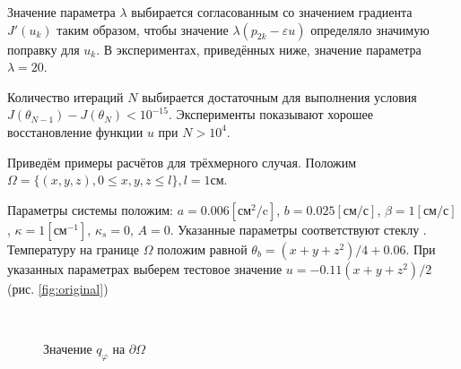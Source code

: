 \documentclass[10pt]{article}
\begin{document}
    Значение параметра $\lambda$ выбирается согласованным со значением градиента $J'(u_k)$
    таким образом, чтобы значение $\lambda(p_{2k}-\varepsilon u)$ определяло значимую поправку для $u_k$.
    В экспериментах, приведённых ниже, значение параметра $\lambda = 20$.

    Количество итераций $N$ выбирается достаточным для выполнения условия
    $J(\theta_{N-1}) - J(\theta_N) < 10^{-15}$. Эксперименты показывают хорошее восстановление функции $u$ при $N > 10^4$.

    Приведём примеры расчётов для трёхмерного случая.
    Положим $\Omega =\{(x,y,z), 0\leq x, y, z \leq l\}, l=1 \text{см}$.

    Параметры системы положим: $a = 0.006[\text{см}^2/\text{c}]$,
    $b=0.025[\text{см}/\text{с}]$, $\beta = 1[\text{см}/\text{с}]$
    , $\kappa=1[\text{см}^{-1}]$, $\kappa_s = 0$, $A = 0$.
    Указанные параметры соответствуют стеклу \cite{grenkin_13}.
    Температуру на границе $\Omega$ положим равной $\theta_b = (x+y+z^2)/4+0.06$.
    При указанных параметрах выберем тестовое значение $u = -0.11(x + y +z^2)/2$ (рис. \ref{fig:original})

    \begin{figure}[H]
        \label{fig:origial}
         \\
        \caption{Значение $q_\varphi$ на $\partial \Omega$}
    \end{figure}
\end{document}
